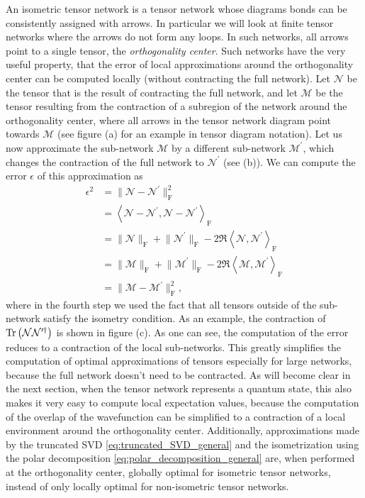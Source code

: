 An isometric tensor network is a tensor network whose diagrams bonds can be consistently assigned with arrows. In particular we will look at finite tensor networks where the arrows do not form any loops. In such networks, all arrows point to a single tensor, the \textit{orthogonality center}. Such networks have the very useful property, that the error of local approximations around the orthogonality center can be computed locally (without contracting the full network). Let $\mathcal{N}$ be the tensor that is the result of contracting the full network, and let $\mathcal{M}$ be the tensor resulting from the contraction of a subregion of the network around the orthogonality center, where all arrows in the tensor network diagram point towards $\mathcal{M}$ (see figure (a) for an example in tensor diagram notation). Let us now approximate the sub-network $\mathcal{M}$ by a different sub-network $\mathcal{M}^\prime$, which changes the contraction of the full network to $\mathcal{N}^\prime$ (see (b)). We can compute the error $\epsilon$ of this approximation as
\begin{equation}
\begin{split}
	\epsilon^2 &= \lVert\mathcal{N}-\mathcal{N}^\prime\rVert^2_\text{F} \\
	&=
	\left\langle\mathcal{N}-\mathcal{N}^\prime, \mathcal{N}-\mathcal{N}^\prime\right\rangle_\text{F} \\
	&= \lVert\mathcal{N}\rVert_\text{F} + \lVert\mathcal{N}^\prime\rVert_\text{F} - 2\Re\left\langle\mathcal{N},\mathcal{N}^\prime\right\rangle_\text{F} \\
	&= \lVert\mathcal{M}\rVert_\text{F} + \lVert\mathcal{M}^\prime\rVert_\text{F} - 2\Re\left\langle\mathcal{M},\mathcal{M}^\prime\right\rangle_\text{F} \\
	&= \lVert\mathcal{M}-\mathcal{M}^\prime\rVert^2_\text{F},
\end{split}
\end{equation}
where in the fourth step we used the fact that all tensors outside of the sub-network satisfy the isometry condition. As an example, the contraction of $\operatorname{Tr}\left(\mathcal{N}\mathcal{N}^{\prime\dagger}\right)$ is shown in figure (c). As one can see, the computation of the error reduces to a contraction of the local sub-networks. This greatly simplifies the computation of optimal approximations of tensors especially for large networks, because the full network doesn't need to be contracted. As will become clear in the next section, when the tensor network represents a quantum state, this also makes it very easy to compute local expectation values, because the computation of the overlap of the wavefunction can be simplified to a contraction of a local environment around the orthogonality center. Additionally, approximations made by the truncated SVD \ref{eq:truncated_SVD_general} and the isometrization using the polar decomposition \ref{eq:polar_decomposition_general} are, when performed at the orthogonality center, globally optimal for isometric tensor networks, instead of only locally optimal for non-isometric tensor networks.
